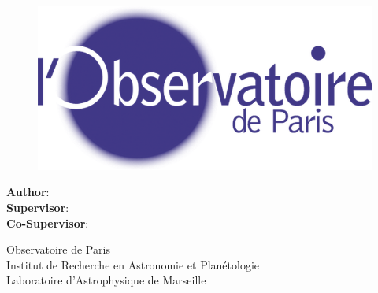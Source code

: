 \makeatletter
\begin{titlepage}
    \begin{center}
        \vspace*{.5cm}

        \Large
        \textbf{\@title}

        \vspace{1.5cm}
        
        \thesistype{}
        
        \vspace{1cm}

        \begin{figure}[htbp]
             \centering
             \includegraphics[width=.5\linewidth]{./Figures/logo_obspm.png}
        \end{figure}

        \vspace{1cm}

        \large
        \textbf{Author}: \thesisauthor{}\\
        \large
        \textbf{Supervisor}: \supervisor{}\\
        \large
        \textbf{Co-Supervisor}: \cosupervisor{}

        \vspace{1cm}
        \large
        Observatoire de Paris \\
        Institut de Recherche en Astronomie et Planétologie \\
        Laboratoire d'Astrophysique de Marseille

        \vspace{1cm}
        \@date
        

\end{center}
\end{titlepage}
